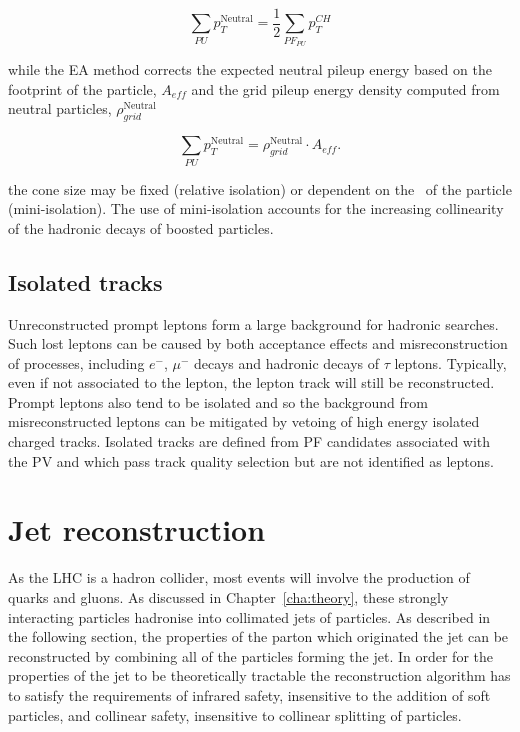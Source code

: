 \begin{equation}
\sum_{PU}p_T^{\text{Neutral}} = \frac{1}{2} \sum_{PF_{PU}}p_T^{CH}
\end{equation}

while the EA method corrects the expected neutral pileup energy based on the footprint of the particle, $A_{eff}$ and the grid pileup
energy density computed from neutral particles, $\rho_{grid}^{\text{Neutral}}$

\begin{equation}
\sum_{PU}p_T^{\text{Neutral}} = \rho_{grid}^{\text{Neutral}}\cdot A_{eff}.
\end{equation}

the cone size may be fixed (relative isolation) or dependent on the \pt~of the particle (mini-isolation). The use of mini-isolation
accounts for the increasing collinearity of the hadronic decays of boosted particles. 

\subsection{Isolated tracks}

Unreconstructed prompt leptons form a large background for hadronic searches.
Such lost leptons can be caused by both acceptance effects and misreconstruction of 
processes, including $e^{-}$, $\mu^{-}$ decays and hadronic decays of $\tau$ leptons. 
Typically, even if not associated to the lepton, the lepton track will still be
reconstructed. Prompt leptons also tend to be isolated and so the background
from misreconstructed leptons can be mitigated by vetoing of high
energy isolated charged tracks. Isolated tracks are defined from PF candidates associated with the PV and 
which pass track quality selection but are not identified as leptons.

\section{Jet reconstruction} 
\label{sec:jet_reco}
As the LHC is a hadron collider, most events will involve the production of quarks and gluons. As discussed in
Chapter~\ref{cha:theory}, these strongly interacting particles hadronise into collimated jets of particles. As described 
in the following section, the properties of the parton which originated the
jet can be reconstructed by combining all of the particles forming the jet. In order for the properties of the jet to be theoretically tractable the
reconstruction algorithm has to satisfy the requirements of infrared safety, insensitive to the addition of 
soft particles, and collinear safety, insensitive to collinear splitting of particles.

